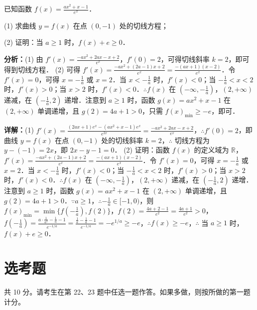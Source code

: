 \begin{question}[points=12]
已知函数 $f(x)=\frac{ax^2+x-1}{e^x}$．

(1) 求曲线 $y=f(x)$ 在点 $(0,-1)$ 处的切线方程；

(2) 证明：当 $a\ge 1$ 时，$f(x)+e\ge 0$．
\begin{solution}

\textbf{分析：}(1) 由 $f'(x)=\frac{-ax^2+2ax-x+2}{e^x}$，$f'(0)=2$，可得切线斜率 $k=2$，即可得到切线方程．
(2) 可得 $f'(x)=\frac{-ax^2+(2a-1)x+2}{e^x}=\frac{-(ax+1)(x-2)}{e^x}$．令 $f'(x)=0$，可得 $x=-\frac{1}{a}$ 或 $x=2$．当 $x<-\frac{1}{a}$ 时，$f'(x)<0$；当 $-\frac{1}{a}<x<2$ 时，$f'(x)>0$；当 $x>2$ 时，$f'(x)<0$．$\therefore f(x)$ 在 $(-\infty,-\frac{1}{a})$，$(2,+\infty)$ 递减，在 $(-\frac{1}{a},2)$ 递增．注意到 $a\ge 1$ 时，函数 $g(x)=ax^2+x-1$ 在 $(2,+\infty)$ 单调递增，且 $g(2)=4a+1>0$，只需 $f(x)_{\min}\ge -e$，即可．

\textbf{详解：}(1) $f'(x)=\frac{(2ax+1)e^x-(ax^2+x-1)e^x}{e^{2x}}=\frac{-ax^2+2ax-x+2}{e^x}$，$\therefore f'(0)=2$，即曲线 $y=f(x)$ 在点 $(0,-1)$ 处的切线斜率 $k=2$，$\therefore$ 切线方程为 $y-(-1)=2x$，即 $2x-y-1=0$．
(2) 证明：函数 $f(x)$ 的定义域为 $\mathbb{R}$，$f'(x)=\frac{-ax^2+(2a-1)x+2}{e^x}=\frac{-(ax+1)(x-2)}{e^x}$．令 $f'(x)=0$，可得 $x=-\frac{1}{a}$ 或 $x=2$．当 $x<-\frac{1}{a}$ 时，$f'(x)<0$；当 $-\frac{1}{a}<x<2$ 时，$f'(x)>0$；当 $x>2$ 时，$f'(x)<0$．$\therefore f(x)$ 在 $(-\infty,-\frac{1}{a})$，$(2,+\infty)$ 递减，在 $(-\frac{1}{a},2)$ 递增．注意到 $a\ge 1$ 时，函数 $g(x)=ax^2+x-1$ 在 $(2,+\infty)$ 单调递增，且 $g(2)=4a+1>0$．$\because a\ge 1$，$\therefore -\frac{1}{a}\in[-1,0)$，则 $f(x)_{\min}=\min\{f(-\frac{1}{a}),f(2)\}$，$f(2)=\frac{4a+2-1}{e^2}=\frac{4a+1}{e^2}>0$，$f(-\frac{1}{a})=\frac{a\cdot\frac{1}{a^2}-\frac{1}{a}-1}{e^{-1/a}}=\frac{\frac{1}{a}-\frac{1}{a}-1}{e^{-1/a}}=-e^{1/a}\ge -e$，$\therefore f(x)\ge -e$，$\therefore$ 当 $a\ge 1$ 时，$f(x)+e\ge 0$．
\end{solution}
\end{question}

\section*{选考题}
共 10 分。请考生在第 22、23 题中任选一题作答。如果多做，则按所做的第一题计分。

